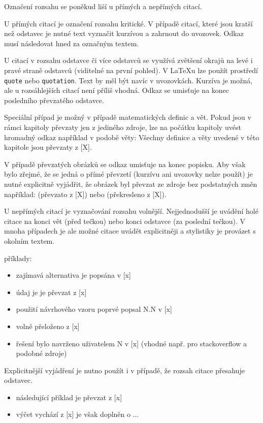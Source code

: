 \documentclass[male,czech,api_bc]{kitheses}
\begin{document}
Označení rozsahu se poněkud liší u přímých a nepřímých citací.

U přímých citací je označení rozsahu kritické. V případě citací, které jsou kratší než odstavec je nutné text vyznačit kurzívou a zahrnout do uvozovek. Odkaz musí následovat hned za označným textem.

U citací v rozsahu odstavce či více odstavců se využívá zvětšení okrajů na levé i pravé straně odstavců (viditelné na první pohled). V \LaTeX u lze použít prostředí \verb!quote! nebo \verb!quotation!. Text by měl být navíc v uvozovkách. Kurzíva je možná, ale u rozsáhlejších citací není příliš vhodná. Odkaz se umisťuje na konec posledního převzatého odstavce.

Speciální případ je možný v případě matematických definic a vět. Pokud jsou v rámci kapitoly převzaty jen z jediného zdroje, lze na počátku kapitoly uvést hromadný odkaz například v podobě věty: Všechny definice a věty uvedené v této kapitole jsou převzaty z [X].

V případě převzatých obrázků se odkaz umisťuje na konec popisku. Aby však bylo zřejmé, že se jedná o přímé převzetí (kurzívu ani uvozovky nelze použít) je nutné explicitně vyjádřit, že obrázek byl převzat ze zdroje bez podstatných změn například: (převzato z [X]) nebo (překresleno z [X]).

U nepřímých citací je vyznačování rozsahu volnější. Nejjednodušší je uvádění holé citace na konci vět (před tečkou) nebo konci odstavce (za poslední tečkou). V mnoha případech je ale možné citace
uvádět explicitněji a stylistiky je provázet s okolním textem.

příklady:

\begin{itemize}
\item zajímavá alternativa je popsána v [x]
\item údaj je je převzat z [x]
\item použití návrhového vzoru poprvé popsal N.N v [x]
\item volně přeloženo z [x]
\item řešení bylo navrženo uživatelem N v [x] (vhodné např. pro stackoverflow a podobné zdroje)
\end{itemize}

Explicitnější vyjádření je nutno použít i v případě, že rozsah citace přesahuje odstavec.

\begin{itemize}
\item následující příklad je převzat z [x]
\item výčet vychází z [x] je však doplněn o ...
\end{itemize}
\end{document}
